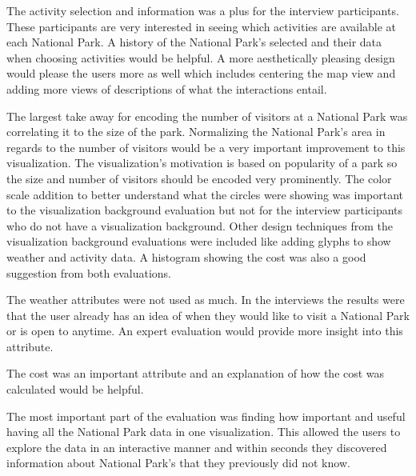  The activity selection and information was a plus for the interview participants. These participants are very interested in seeing which activities are available at each National Park. A history of the National Park's selected and their data when choosing activities would be helpful. A more aesthetically pleasing design would please the users more as well which includes centering the map view and adding more views of descriptions of what the interactions entail. 

 The largest take away for encoding the number of visitors at a National Park was correlating it to the size of the park. Normalizing the National Park's area in regards to the number of visitors would be a very important improvement to this visualization. The visualization's motivation is based on popularity of a park so the size and number of visitors should be encoded very prominently. The color scale addition to better understand what the circles were showing was important to the visualization background evaluation but not for the interview participants who do not have a visualization background. Other design techniques from the visualization background evaluations were included like adding glyphs to show weather and activity data. A histogram showing the cost was also a good suggestion from both evaluations. 

 The weather attributes were not used as much. In the interviews the results were that the user already has an idea of when they would like to visit a National Park or is open to anytime. An expert evaluation would provide more insight into this attribute.

 The cost was an important attribute and an explanation of how the cost was calculated would be helpful.

 The most important part of the evaluation was finding how important and useful having all the National Park data in one visualization. This allowed the users to explore the data in an interactive manner and within seconds they discovered information about National Park's that they previously did not know.

